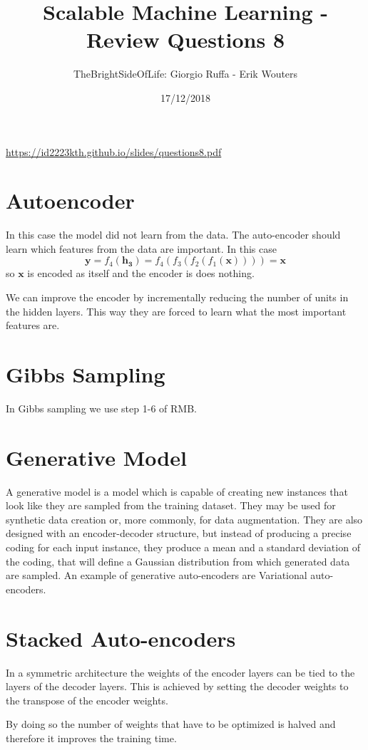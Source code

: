 \documentclass[a4paper]{article}
\title{Scalable Machine Learning - Review Questions 8}
\author{TheBrightSideOfLife: Giorgio Ruffa - Erik Wouters}
\date{17/12/2018}
\begin{document}
\maketitle

\url{https://id2223kth.github.io/slides/questions8.pdf}

\section{Autoencoder}
In this case the model did not learn from the data. The auto-encoder should learn which features from the data are important. In this case
\begin{equation}
    \mathbf{y} = f_4(\mathbf{h_3}) = f_4(f_3(f_2(f_1(\mathbf{x})))) = \mathbf{x}
\end{equation}
so $\mathbf{x}$ is encoded as itself and the encoder is does nothing.

We can improve the encoder by incrementally reducing the number of units in the hidden layers. This way they are forced to learn what the most important features are.

\section{Gibbs Sampling}
In Gibbs sampling we use step 1-6 of RMB.

\section{Generative Model}
A generative model is a model which is capable of creating new instances that look like they are sampled from the training dataset. They may be used for synthetic data creation or, more commonly, for data augmentation. They are also designed with an encoder-decoder structure, but instead of producing a precise coding for each input instance, they produce a mean and a standard deviation of the coding, that will define a Gaussian distribution from which generated data are sampled. An example of generative auto-encoders are Variational auto-encoders. 

\section{Stacked Auto-encoders}
In a symmetric architecture the weights of the encoder layers can be tied to the layers of the decoder layers. This is achieved by setting the decoder weights to the transpose of the encoder weights.

By doing so the number of weights that have to be optimized is halved and therefore it improves the training time.


% 
\end{document}

